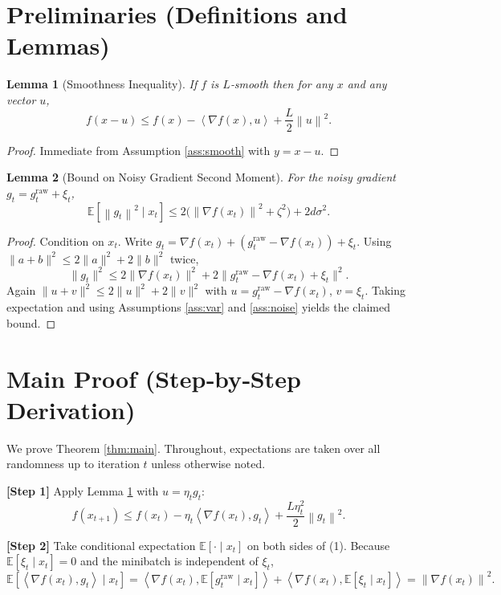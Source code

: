 \documentclass{article}
\newtheorem{lemma}{Lemma}
\newcommand{\E}{\mathbb{E}}
\newcommand{\norm}[1]{\left\|#1\right\|}
\newcommand{\inner}[2]{\left\langle #1,#2\right\rangle}
\begin{document}
\newpage
\section*{Preliminaries (Definitions and Lemmas)}
\begin{lemma}[Smoothness Inequality]\label{lem:smooth}
If $f$ is $L$‑smooth then for any $x$ and any vector $u$,
\[
f(x-u)\le f(x)-\inner{\nabla f(x)}{u}+\frac{L}{2}\norm{u}^{2}.
\]
\end{lemma}
\begin{proof}
Immediate from Assumption \ref{ass:smooth} with $y=x-u$.
\end{proof}

\begin{lemma}[Bound on Noisy Gradient Second Moment]\label{lem:noise}
For the noisy gradient $g_{t}=g^{\text{raw}}_{t}+\xi_{t}$,
\[
\E\!\left[\norm{g_{t}}^{2}\mid x_{t}\right]
\le 2\bigl(\norm{\nabla f(x_{t})}^{2}+\zeta^{2}\bigr)+2d\sigma^{2}.
\]
\end{lemma}
\begin{proof}
Condition on $x_{t}$. Write $g_{t}= \nabla f(x_{t})+(g^{\text{raw}}_{t}-\nabla f(x_{t}))+\xi_{t}$. Using $\|a+b\|^{2}\le 2\|a\|^{2}+2\|b\|^{2}$ twice,
\[
\|g_{t}\|^{2}\le 2\|\nabla f(x_{t})\|^{2}+2\|g^{\text{raw}}_{t}-\nabla f(x_{t})+\xi_{t}\|^{2}.
\]
Again $\|u+v\|^{2}\le2\|u\|^{2}+2\|v\|^{2}$ with $u=g^{\text{raw}}_{t}-\nabla f(x_{t})$, $v=\xi_{t}$. Taking expectation and using Assumptions \ref{ass:var} and \ref{ass:noise} yields the claimed bound.
\end{proof}

\section*{Main Proof (Step‑by‑Step Derivation)}
We prove Theorem \ref{thm:main}. Throughout, expectations are taken over all randomness up to iteration $t$ unless otherwise noted.

\bigskip
\noindent\textbf{[Step 1]} Apply Lemma \ref{lem:smooth} with $u=\eta_{t}g_{t}$:
\[
f(x_{t+1})\le f(x_{t})-\eta_{t}\inner{\nabla f(x_{t})}{g_{t}}+\frac{L\eta_{t}^{2}}{2}\norm{g_{t}}^{2}.
\tag{1}
\]

\noindent\textbf{[Step 2]} Take conditional expectation $\E[\cdot\mid x_{t}]$ on both sides of (1).  
Because $\E[\xi_{t}\mid x_{t}]=0$ and the minibatch is independent of $\xi_{t}$,
\[
\E\!\left[\inner{\nabla f(x_{t})}{g_{t}}\mid x_{t}\right]
=\inner{\nabla f(x_{t})}{\E[g^{\text{raw}}_{t}\mid x_{t}]}+\inner{\nabla f(x_{t})}{\E[\xi_{t}\mid x_{t}]}
=\norm{\nabla f(x_{t})}^{2}.
\tag{2}
\]
\end{document}
